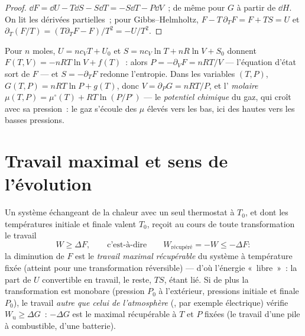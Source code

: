 \begin{proof}
$\dd F = \dd U - T\dd S - S\dd T = -S\dd T - P\dd V$~; de même pour $G$
à partir de $\dd H$. On lit les dérivées partielles~; pour Gibbs--Helmholtz,
$F - T\,\partial_TF = F + TS = U$ et $\partial_T(F/T) = (T\partial_TF -
F)/T^2 = -U/T^2$.
\end{proof}

\begin{example}\label{ex:b2:thermodynamic-potentials:perfect}
Pour $n$ moles, $U = nc_{V}T + U_0$ et $S = nc_V\ln T + nR\ln V + S_0$
donnent $F(T,V) = -nRT\ln V + f(T)$~: alors $P = -\partial_VF = nRT/V$
--- l'équation d'état sort de $F$ --- et $S = -\partial_TF$
redonne l'entropie. Dans les variables $(T,P)$, $G(T,P) = nRT\ln P +
g(T)$, donc $V = \partial_PG = nRT/P$, et l' \emph{molaire}
$\mu(T,P) = \mu^\circ(T) + RT\ln(P/P^\circ)$ --- le \emph{potentiel
chimique} du gaz, qui croît avec sa
pression~: le gaz s'écoule des $\mu$ élevés vers les bas, ici des hautes vers les basses
pressions.
\end{example}

\section{Travail maximal et sens de l'évolution}

\begin{theorem}\label{thm:b2:thermodynamic-potentials:monothermal}
Un système échangeant de la chaleur avec un seul thermostat à $T_0$, et dont les
températures initiale et finale valent $T_0$, reçoit au cours de toute
transformation le travail
\[
W \ge \Delta F , \qquad\text{c'est-à-dire}\qquad W_{\text{récupéré}} = -W \le -\Delta F :
\]
la diminution de $F$ est le \emph{travail maximal récupérable} du
système à température fixée (atteint pour une transformation réversible) ---
d'où l'énergie «~libre~»~: la part de $U$ convertible en travail, le
reste, $TS$, étant lié. Si de plus la transformation est monobare
(pression $P_0$ à l'extérieur, pressions initiale et finale $P_0$), le travail
\emph{autre que celui de l'atmosphère} (, par exemple électrique)
vérifie $W_{\text{u}} \ge \Delta G$~: $-\Delta G$ est le  maximal
récupérable à $T$ et $P$ fixées (le travail d'une pile à combustible, d'une
batterie).
\end{theorem}

